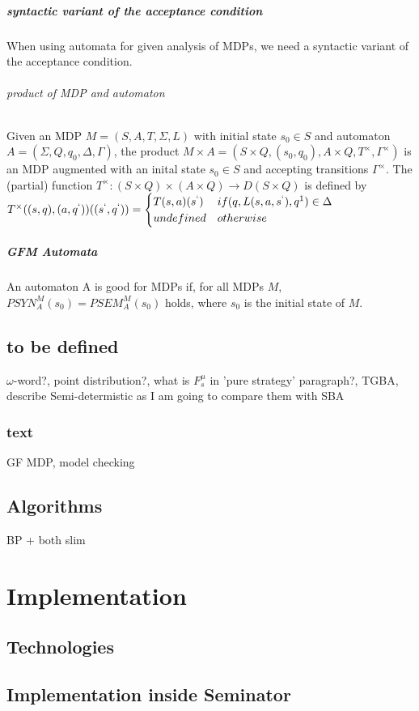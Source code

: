 \documentclass[
	digital
nolof, nolot
]{fithesis3}
\begin{document}
		\paragraph{syntactic variant of the acceptance condition}
		When using automata for given analysis of MDPs, we need
		a syntactic variant of the acceptance condition.
		\subparagraph{product of MDP and automaton}
		Given an MDP $M=(S,A,T,\Sigma,L)$ with initial state $s_0 \in S$
		and automaton $A = (\Sigma, Q, q_0, \Delta, \Gamma)$,
		the product $M \times A = (
		S \times Q,
		(s_0, q_0),
		A \times Q,
		T^\times,
		\Gamma^\times
		)$ is an MDP augmented with an inital state $s_0 \in S$ 
		and accepting transitions $\Gamma^\times$.
		The (partial) function
		$T^\times:
		(S \times Q) \times (A \times Q) \rightarrow D(S \times Q)$
		is defined by
		$T^\times((s,q), (a,q^`))((s^`, q^`))=
		\begin{cases}
			T(s,a)(s^`) &if (q,L(s,a,s^`),q^1) \in \Delta\\
			undefined &otherwise
		\end{cases}
		$
		\paragraph{GFM Automata}
		An automaton A is good for MDPs if, for all MDPs $M$, $PSYN_A^M(s_0) = PSEM_A^M(s_0)$ holds, where $s_0$ is the initial state of $M$.
		\section{to be defined}
		$\omega$-word?, point distribution?, what is $F_s^\mu$ in 'pure strategy' paragraph?, TGBA, describe Semi-determistic as I am going to compare them with SBA 
		\subsection{text}
		 
		
		GF MDP, model checking
		\section{Algorithms}
		BP + both slim 
	\chapter{Implementation}
		\section{Technologies}
		\section{Implementation inside Seminator}
\end{document}
